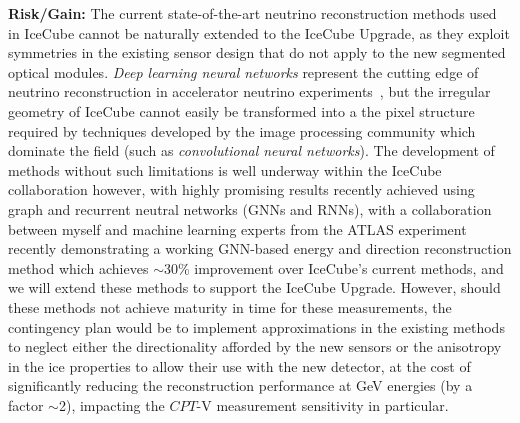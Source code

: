 \documentclass[a4paper,11pt]{article}
\begin{document}

\textbf{Risk/Gain:} The current state-of-the-art neutrino reconstruction methods used in IceCube cannot be naturally extended to the IceCube Upgrade, as they exploit symmetries in the existing sensor design that do not apply to the new segmented optical modules. \textit{Deep learning neural networks} represent the cutting edge of neutrino reconstruction in accelerator neutrino experiments~\cite{Baldi:2018qhe, Adams:2018bvi}, but the irregular geometry of IceCube cannot easily be transformed into a the pixel structure required by techniques developed by the image processing community which dominate the field (such as \textit{convolutional neural networks}). The development of methods without such limitations is well underway within the IceCube collaboration however, with highly promising results recently achieved using graph and recurrent neutral networks (GNNs and RNNs), with a collaboration between myself and machine learning experts from the ATLAS experiment recently demonstrating a working GNN-based energy and direction reconstruction method which achieves $\sim$30\% improvement over IceCube's current methods, and we will extend these methods to support the IceCube Upgrade. However, should these methods not achieve maturity in time for these measurements, the contingency plan would be to implement approximations in the existing methods to neglect either the directionality afforded by the new sensors or the anisotropy in the ice properties to allow their use with the new detector, at the cost of significantly reducing the reconstruction performance at GeV energies (by a factor $\sim$2), impacting the $CPT$-V measurement sensitivity in particular. \\
\end{document}
